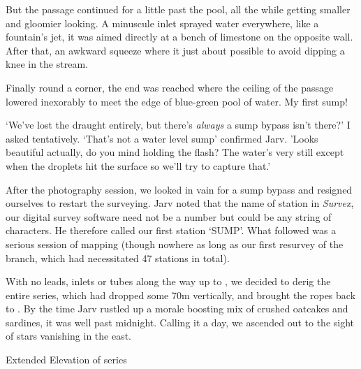 But the passage continued for a little past the pool, all the while getting smaller and gloomier looking. A minuscule inlet sprayed water everywhere, like a fountain's jet, it was aimed directly at a bench of limestone on the opposite wall. After that, an awkward squeeze where it just about possible to avoid dipping a knee in the stream. 

Finally round a corner, the end was reached where the ceiling of the passage lowered inexorably to meet the edge of blue-green pool of water. My first sump!

`We've lost the draught entirely, but there's \emph{always} a sump bypass isn't there?' I asked tentatively.
`That's not a water level sump' confirmed Jarv. 'Looks beautiful actually, do you mind holding the flash? The water's very still except when the droplets hit the surface so we'll try to capture that.'

After the photography session, we looked in vain for a sump bypass and resigned ourselves to restart the surveying. Jarv noted that the name of station in \emph{Survex}, our digital survey software need not be a number but could be any string of characters. He therefore called our first station `SUMP'. What followed was a serious session of mapping (though nowhere as long as our first resurvey of the  branch, which had necessitated 47 stations in total). 

With no leads, inlets or tubes along the way up to , we decided to derig the entire series, which had dropped some 70m vertically, and brought the ropes back to . By the time Jarv rustled up a morale boosting mix of crushed oatcakes and sardines, it was well past midnight. Calling it a day, we ascended out to the sight of stars vanishing in the east. 


\begin{pagesurvey}
\checkoddpage \ifoddpage \forcerectofloat \else \forceversofloat \fi
{}
\caption[Extended Elevation of Jack of Hearts]{Extended Elevation of \protect{} series}
\end{pagesurvey}
